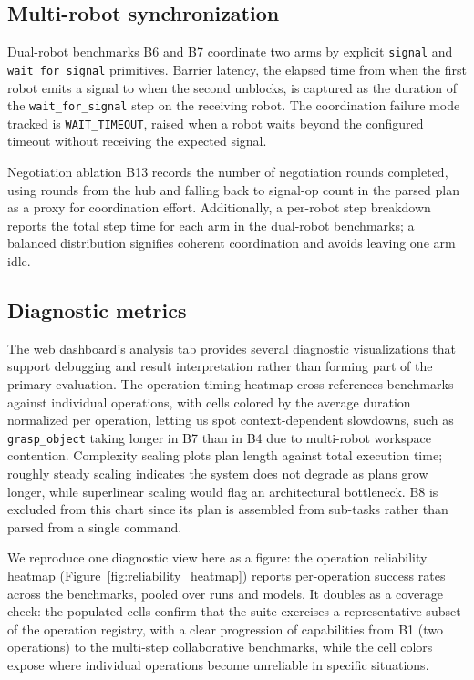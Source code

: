 \documentclass[
     12pt,
     a4paper,
     BCOR=10mm,
     DIV=14,
     listof=totoc,
     bibliography=totoc,
     parskip,
     twoside,
     headsepline
     ]{scrreprt}
\begin{document}
\subsection{Multi-robot synchronization}
Dual-robot benchmarks B6 and B7 coordinate two arms by explicit \texttt{signal} and \texttt{wait\_for\_signal} primitives. Barrier latency, the elapsed time from when the first robot emits a signal to when the second unblocks, is captured as the duration of the \texttt{wait\_for\_signal} step on the receiving robot. The coordination failure mode tracked is \texttt{WAIT\_TIMEOUT}, raised when a robot waits beyond the configured timeout without receiving the expected signal.

Negotiation ablation B13 records the number of negotiation rounds completed, using rounds from the hub and falling back to signal-op count in the parsed plan as a proxy for coordination effort. Additionally, a per-robot step breakdown reports the total step time for each arm in the dual-robot benchmarks; a balanced distribution signifies coherent coordination and avoids leaving one arm idle.

\subsection{Diagnostic metrics}
The web dashboard's analysis tab provides several diagnostic visualizations that support debugging and result interpretation rather than forming part of the primary evaluation. The operation timing heatmap cross-references benchmarks against individual operations, with cells colored by the average duration normalized per operation, letting us spot context-dependent slowdowns, such as \texttt{grasp\_object} taking longer in B7 than in B4 due to multi-robot workspace contention. Complexity scaling plots plan length against total execution time; roughly steady scaling indicates the system does not degrade as plans grow longer, while superlinear scaling would flag an architectural bottleneck. B8 is excluded from this chart since its plan is assembled from sub-tasks rather than parsed from a single command.

We reproduce one diagnostic view here as a figure: the operation reliability heatmap (Figure~\ref{fig:reliability_heatmap}) reports per-operation success rates across the benchmarks, pooled over runs and models. It doubles as a coverage check: the populated cells confirm that the suite exercises a representative subset of the operation registry, with a clear progression of capabilities from B1 (two operations) to the multi-step collaborative benchmarks, while the cell colors expose where individual operations become unreliable in specific situations.
\end{document}
